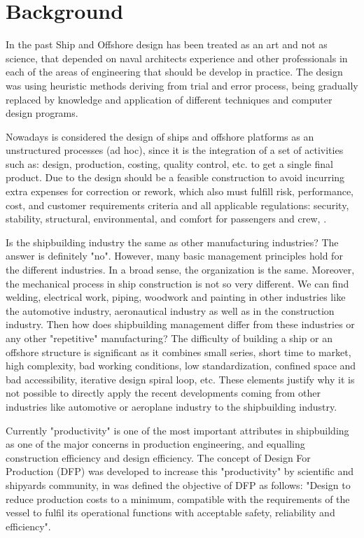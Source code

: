 \section{Background}
In the past Ship and Offshore design has been treated as an art and not as science, that depended on naval architects experience and other professionals in each of the areas of engineering that should be develop in practice. The design was using heuristic methods deriving from trial and error process, being gradually replaced by knowledge and application of different techniques and computer design programs.


Nowadays is considered the design of ships and offshore platforms as an unstructured processes (ad hoc), since it is the integration of a set of activities such as: design, production, costing, quality control, etc. to get a single final product. Due to the design should be a feasible construction to avoid incurring extra expenses for correction or rework, which also must fulfill  risk, performance, cost, and customer requirements criteria and all applicable regulations: security, stability, structural, environmental, and comfort for passengers and crew, \cite{CapracePRADS10}.


Is the shipbuilding industry the same as other manufacturing industries? The answer is definitely "no". However, many basic management principles hold for the different industries. In a broad sense, the organization is the same. Moreover, the mechanical process in ship construction is not so very different. We can find welding, electrical work, piping, woodwork and painting in other industries like the automotive industry, aeronautical industry as well as in the construction industry. Then how does shipbuilding management differ from these industries or any other "repetitive" manufacturing? The difficulty of building a ship or an offshore structure is significant as it combines small series, short time to market, high complexity, bad working conditions, low standardization, confined space and bad accessibility, iterative design spiral loop, etc. These elements justify why it is not possible to directly apply the recent developments coming from other industries like automotive or aeroplane industry to the shipbuilding industry.


Currently "productivity" is one of the most important attributes in shipbuilding as one of the major concerns in production engineering, and equalling construction efficiency and design efficiency. The concept of Design For Production (DFP) was developed to increase this "productivity" by scientific and shipyards community, in \cite{USA1999} was defined the objective of DFP as follows:
"Design to reduce production costs to a minimum, compatible with the requirements of the vessel to fulfil its operational functions with acceptable safety, reliability and efficiency".


